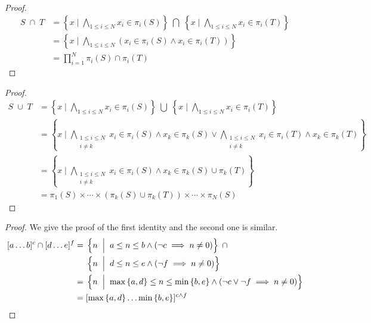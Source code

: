 \newcommand{\off}{S}
\newcommand{\offP}{T}
\newcommand\MID{\;\mathrel{\Big|}\;}

\vectorIntersect*

\begin{proof}
  \begin{align*}
    \off \; \cap \; \offP &
    = \left\{x \MID \bigwedge_{1 \leq i \leq N } x_i \in \pi_i(\off) \right\}
      \;\bigcap\;
      \left\{x \MID \bigwedge_{1 \leq i \leq N } x_i \in \pi_i(\offP) \right\} \\
    & = \left\{x \MID \bigwedge_{1 \leq i \leq N }
      (x_i \in \pi_i(\off) \wedge x_i \in \pi_i(\offP)) \right\} \\
    & = \prod_{i = 1}^{N} \pi_i(\off) \cap \pi_i(\offP)
  \end{align*}
\end{proof}

\vectorUnion*

\begin{proof}
  \begin{align*}
    \off \; \cup \; \offP &
    = \left\{x \MID
      \bigwedge_{1 \leq i \leq N } x_i \in \pi_i(\off) \right\}
      \;\bigcup\;
      \left\{x \MID
          \bigwedge_{1 \leq i \leq N } x_i \in \pi_i(\offP) \right\} \\
    & = \left\{x \MID
          \bigwedge_{\substack{1 \leq i \leq N \\ i \neq k}}
            x_i \in \pi_i(\off) \wedge x_k \in \pi_k(\off) \vee
          \bigwedge_{\substack{1 \leq i \leq N \\ i \neq k}} x_i \in
            \pi_i(\offP) \wedge x_k \in \pi_k(\offP)
        \right\} \\
    & = \left\{x \MID
          \bigwedge_{\substack{1 \leq i \leq N \\ i \neq k}} x_i \in
            \pi_i(\off) \wedge
            x_k \in \pi_k(\off) \cup \pi_k(\offP)
        \right\} \\
        & = \pi_1(\off) \times \cdots \times
        (\pi_k(\off) \cup \pi_k(\offP)) \times \cdots \times
        \pi_N(\off)
  \end{align*}
\end{proof}

\intervalIdentities*

\begin{proof}
  We give the proof of the first identity and the second one is similar.
  \begin{align*}
    \interv{a}{b}{c} \cap \interv{d}{e}{f} = &
      \; \left\{ n \MID a \leq n \leq b \wedge (\neg c \implies n \neq 0) \right\}
      \;\cap \\
      & \; \left\{ n \MID d \leq n \leq e \wedge (\neg f \implies n \neq 0) \right\}
      \\
    = & \; \left\{ n \MID \max \left\{a,d\right\} \leq n \leq \min \left\{b,e\right\} \wedge (\neg c
      \vee \neg f \implies n \neq 0) \right\} \\
    = & \; \interv{\max{\left\{a,d\right\}}}{\min{\left\{b,e\right\}}}{c \wedge f}
  \end{align*}
\end{proof}

